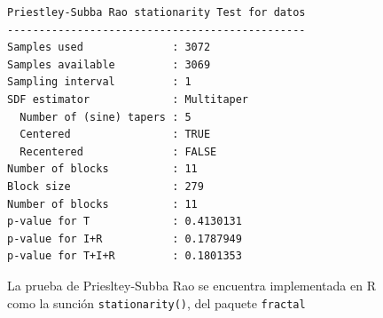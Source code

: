 \documentclass{beamer}
\newtheorem{prop}{Proposici\'on}
\newcommand{\aste}[1]{\widehat{ #1 }^{\star}}
\newcommand{\E}[1]{\mathrm{E}\left[ #1 \right]}
\newcommand{\Var}[1]{\mathrm{Var}\left( #1 \right)}
\newcommand{\abso}[1]{\left| #1 \right|}
\begin{document}

\begin{frame}[fragile]

\begin{figure}
\centering
\begin{lstlisting}
Priestley-Subba Rao stationarity Test for datos
-----------------------------------------------
Samples used              : 3072 
Samples available         : 3069 
Sampling interval         : 1 
SDF estimator             : Multitaper 
  Number of (sine) tapers : 5 
  Centered                : TRUE 
  Recentered              : FALSE 
Number of blocks          : 11 
Block size                : 279 
Number of blocks          : 11 
p-value for T             : 0.4130131 
p-value for I+R           : 0.1787949 
p-value for T+I+R         : 0.1801353 
\end{lstlisting}
\caption{La prueba de Priesltey-Subba Rao se encuentra implementada en R
como la sunci\'on \texttt{stationarity()}, del paquete \texttt{fractal}}
\end{figure}
\end{frame}


%


\end{document}
